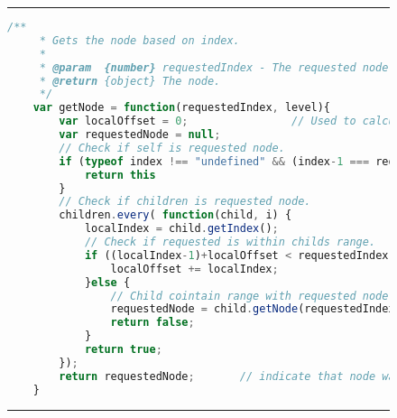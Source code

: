 \begin{figure}[H]
\noindent\rule{\textwidth}{1pt}
\begin{lstlisting}[language=JavaScript, caption={Recursive to get node in tree, initiated by FDG(root)}, label={lst:getNode}]
    /**
     * Gets the node based on index.
     *
     * @param  {number} requestedIndex - The requested node index
     * @return {object} The node.
     */
    var getNode = function(requestedIndex, level){
        var localOffset = 0;                // Used to calculate relative index.
        var requestedNode = null;
        // Check if self is requested node.
        if (typeof index !== "undefined" && (index-1 === requestedIndex)) { 
            return this
        }
        // Check if children is requested node.
        children.every( function(child, i) { 
            localIndex = child.getIndex();
            // Check if requested is within childs range.
            if ((localIndex-1)+localOffset < requestedIndex){               
                localOffset += localIndex;
            }else {
                // Child cointain range with requested node.
                requestedNode = child.getNode(requestedIndex - localOffset);
                return false;
            }
            return true;
        });
        return requestedNode;       // indicate that node was not found
    }
\end{lstlisting}
\noindent\rule{\textwidth}{1pt}
\end{figure}